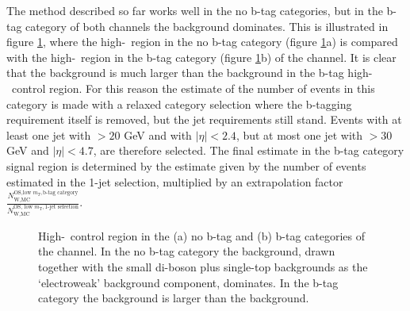 The method described so far works well in the no b-tag categories, but in the b-tag category of both channels
the \ttbar background dominates. This is illustrated in figure \ref{fig:bkgs_highmtctrl}, where
the high-\mT~region in the no b-tag category (figure \ref{fig:bkgs_highmtctrl}a) is compared with the high-\mT~region in the 
b-tag category (figure \ref{fig:bkgs_highmtctrl}b) of the \etau channel. It is clear that the \ttbar 
background is much larger than the \Wjets background in the b-tag high-\mT~control region.
For this reason the estimate of the number
of \Wjets events in this category is made with a relaxed category selection where the b-tagging
requirement itself is removed, but the jet requirements still stand. Events with at least one 
jet with \pT$>20$ GeV and with $|\eta|<2.4$, but at most one jet with \pT$>30$ GeV and $|\eta|<4.7$, are therefore selected. The final \Wjets estimate in the b-tag category signal
region is determined by the estimate given by the number of \Wjets events
estimated in the 1-jet selection, multiplied by an extrapolation factor 
$\frac{N_{\text{W,MC}}^{\text{OS,low } m_{T},\text{b-tag category}}}{N_{\text{W,MC}}^{\text{OS, low }m_{\text{T}},\text{1-jet selection}}}$.
\begin{figure}[h!]
\begin{center}
\end{center}
\caption{High-\mT~control region in the (a) no b-tag and (b) b-tag categories of the \etau
channel. In the no b-tag category the \Wjets background, drawn together with the small
 di-boson plus single-top backgrounds as the `electroweak' background component, dominates. In the b-tag
category the \ttbar background is larger than the \Wjets background.}
\label{fig:bkgs_highmtctrl}
\end{figure}

